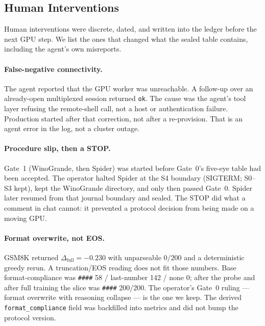 \subsection{Human Interventions}
\label{p2:interventions}
Human interventions were discrete, dated, and written into the
ledger before the next GPU step. We list the ones that changed
what the sealed table contains, including the agent's own
misreports.

\paragraph{False-negative connectivity.}
The agent reported that the GPU worker was unreachable. A
follow-up over an already-open multiplexed session returned
\texttt{ok}. The cause was the agent's tool layer refusing the
remote-shell call, not a host or authentication failure.
Production started after that correction, not after a
re-provision.
That is an agent error in the log, not a cluster outage.

\paragraph{Procedure slip, then a STOP.}
Gate~1 (WinoGrande, then Spider) was started before Gate~0's
five-eye table had been accepted. The operator halted Spider at
the S4 boundary (SIGTERM; S0--S3 kept), kept the WinoGrande
directory, and only then passed Gate~0.
Spider later resumed from that journal boundary and sealed.
The STOP did what a comment in chat cannot: it prevented a
protocol decision from being made on a moving GPU.

\paragraph{Format overwrite, not EOS.}
GSM8K returned $\Delta_{\mathrm{full}}=-0.230$ with unparseable
$0/200$ and a deterministic greedy rerun.
A truncation/EOS reading does not fit those numbers. Base
format-compliance was \texttt{\#\#\#\#} 58 / last-number 142 /
none 0; after the probe and after full training the slice was
\texttt{\#\#\#\#} 200/200.
The operator's Gate~0 ruling --- format overwrite with reasoning
collapse --- is the one we keep. The derived
\texttt{format\_compliance} field was backfilled into metrics and
did not bump the protocol version.

